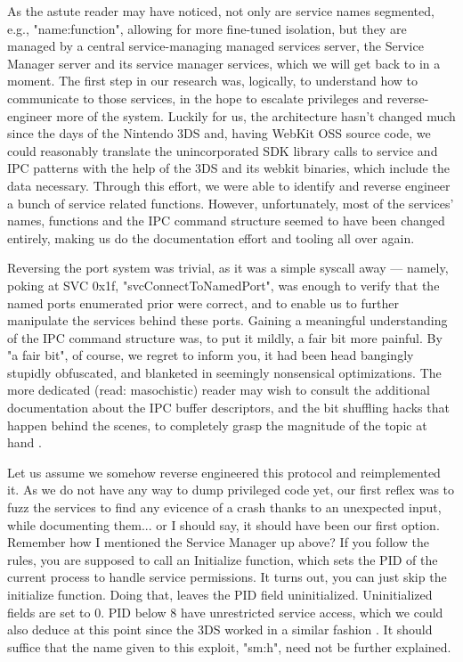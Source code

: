 \documentclass[journal]{IEEEtran}
\begin{document}
As the astute reader may have noticed, not only are service names segmented, e.g., "name:function",
allowing for more fine-tuned isolation, but they are managed by a central service-managing managed
services server, the Service Manager server and its service manager services, which we will get
back to in a moment. The first step in our research was, logically, to understand how to
communicate to those services, in the hope to escalate privileges and reverse-engineer more of
the system. Luckily for us, the architecture hasn't changed much since the days of the
Nintendo 3DS and, having WebKit OSS source code, we could reasonably translate the unincorporated 
SDK library calls to service and IPC patterns with the help of the 3DS and its webkit binaries,
which include the data necessary. Through this effort, we were able to identify and reverse engineer
a bunch of service related functions. However, unfortunately, most of the services' names, functions
and the IPC command structure seemed to have been changed entirely, making us do the documentation
effort and tooling all over again.

Reversing the port system was trivial, as it was a simple syscall away --- namely, poking at SVC
0x1f, "svcConnectToNamedPort"\cite{syscalls}, was enough to verify that the named ports enumerated
prior were correct, and to enable us to further manipulate the services behind these ports.
Gaining a meaningful understanding of the IPC command structure was, to put it mildly, a fair
bit more painful. By "a fair bit", of course, we regret to inform you, it had been head bangingly
stupidly obfuscated, and blanketed in seemingly nonsensical optimizations.
The more dedicated (read: masochistic) reader may wish to consult the additional documentation
about the IPC buffer descriptors, and the bit shuffling hacks that happen behind the scenes, to
completely grasp the magnitude of the topic at hand \cite{ipc_madness}.

Let us assume we somehow reverse engineered this protocol and reimplemented it.
As we do not have any way to dump privileged code yet, our first reflex was to
fuzz the services to find any evicence of a crash thanks to an unexpected input, while documenting
them... or I should say, it should have been our first option. Remember how I mentioned the Service
Manager up above? If you follow the rules, you are supposed to call an Initialize function, which
sets the PID of the current process to handle service permissions. It turns out, you can just
skip the initialize function.
Doing that, leaves the PID field uninitialized. Uninitialized fields are set to 0. PID
below 8 have unrestricted service access, which we could also deduce at this point since
the 3DS worked in a similar fashion \cite{pre_smh}.
It should suffice that the name given to this exploit, "sm:h", need not be further explained.
\end{document}
